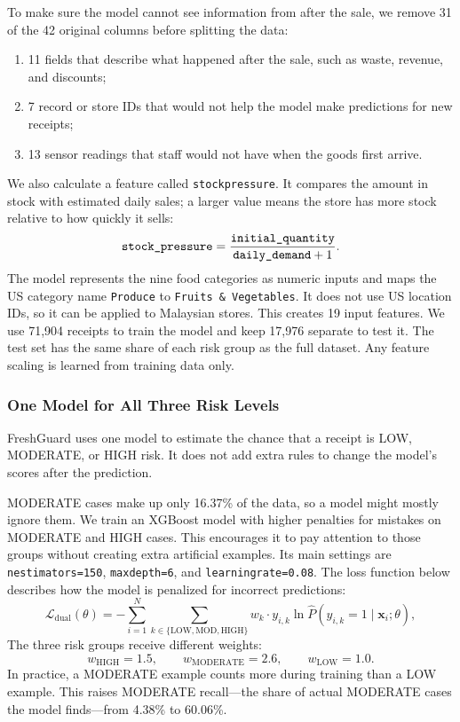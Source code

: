 \documentclass[12pt,a4paper]{article}
\renewcommand{\_}{\oldunderscore\allowbreak}
\begin{document}
To make sure the model cannot see information from after the sale, we remove 31 of the 42 original columns before splitting the data:
\begin{enumerate}[leftmargin=18pt, itemsep=1.5pt]
    \item 11 fields that describe what happened after the sale, such as waste, revenue, and discounts;
    \item 7 record or store IDs that would not help the model make predictions for new receipts;
    \item 13 sensor readings that staff would not have when the goods first arrive.
\end{enumerate}
We also calculate a feature called \texttt{stock\_pressure}. It compares the amount in stock with estimated daily sales; a larger value means the store has more stock relative to how quickly it sells:
\begin{equation}
    \texttt{stock\_pressure} = \frac{\texttt{initial\_quantity}}{\texttt{daily\_demand} + 1}.
\end{equation}
The model represents the nine food categories as numeric inputs and maps the US category name \texttt{Produce} to \texttt{Fruits \& Vegetables}. It does not use US location IDs, so it can be applied to Malaysian stores. This creates 19 input features. We use 71,904 receipts to train the model and keep 17,976 separate to test it. The test set has the same share of each risk group as the full dataset. Any feature scaling is learned from training data only.

\subsubsection{One Model for All Three Risk Levels}
FreshGuard uses one model to estimate the chance that a receipt is LOW, MODERATE, or HIGH risk. It does not add extra rules to change the model's scores after the prediction.

MODERATE cases make up only 16.37\% of the data, so a model might mostly ignore them. We train an XGBoost model with higher penalties for mistakes on MODERATE and HIGH cases. This encourages it to pay attention to those groups without creating extra artificial examples. Its main settings are \texttt{n\_estimators=150}, \texttt{max\_depth=6}, and \texttt{learning\_rate=0.08}. The loss function below describes how the model is penalized for incorrect predictions:
\begin{equation}
    \mathcal{L}_{\text{dual}}(\theta) = -\sum_{i=1}^{N} \sum_{k \in \{\text{LOW}, \text{MOD}, \text{HIGH}\}} w_k \cdot y_{i,k} \ln \hat{P}(y_{i,k} = 1 \mid \mathbf{x}_i; \theta),
\end{equation}
The three risk groups receive different weights:
\begin{equation}
    w_{\text{HIGH}} = 1.5, \qquad w_{\text{MODERATE}} = 2.6, \qquad w_{\text{LOW}} = 1.0.
\end{equation}
In practice, a MODERATE example counts more during training than a LOW example. This raises MODERATE recall—the share of actual MODERATE cases the model finds—from 4.38\% to 60.06\%.
\end{document}
